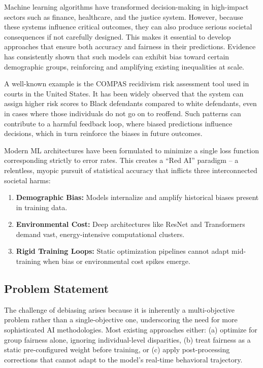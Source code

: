 \documentclass[12pt,a4paper]{article}
\begin{document}
Machine learning algorithms have transformed decision-making in high-impact sectors such as finance, healthcare, and the justice system. However, because these systems influence critical outcomes, they can also produce serious societal consequences if not carefully designed. This makes it essential to develop approaches that ensure both accuracy and fairness in their predictions. Evidence has consistently shown that such models can exhibit bias toward certain demographic groups, reinforcing and amplifying existing inequalities at scale. 

A well-known example is the COMPAS recidivism risk assessment tool used in courts in the United States. It has been widely observed that the system can assign higher risk scores to Black defendants compared to white defendants, even in cases where those individuals do not go on to reoffend. Such patterns can contribute to a harmful feedback loop, where biased predictions influence decisions, which in turn reinforce the biases in future outcomes. 

Modern ML architectures have been formulated to minimize a single loss function corresponding strictly to error rates. This creates a ``Red AI'' paradigm -- a relentless, myopic pursuit of statistical accuracy that inflicts three interconnected societal harms:

\begin{enumerate}
    \item \textbf{Demographic Bias:} Models internalize and amplify historical biases present in training data.
    \item \textbf{Environmental Cost:} Deep architectures like ResNet and Transformers demand vast, energy-intensive computational clusters.
    \item \textbf{Rigid Training Loops:} Static optimization pipelines cannot adapt mid-training when bias or environmental cost spikes emerge.
\end{enumerate}

\subsection{Problem Statement}

The challenge of debiasing arises because it is inherently a multi-objective problem rather than a single-objective one, underscoring the need for more sophisticated AI methodologies. Most existing approaches either: (a) optimize for group fairness alone, ignoring individual-level disparities, (b) treat fairness as a static pre-configured weight before training, or (c) apply post-processing corrections that cannot adapt to the model's real-time behavioral trajectory.
\end{document}
